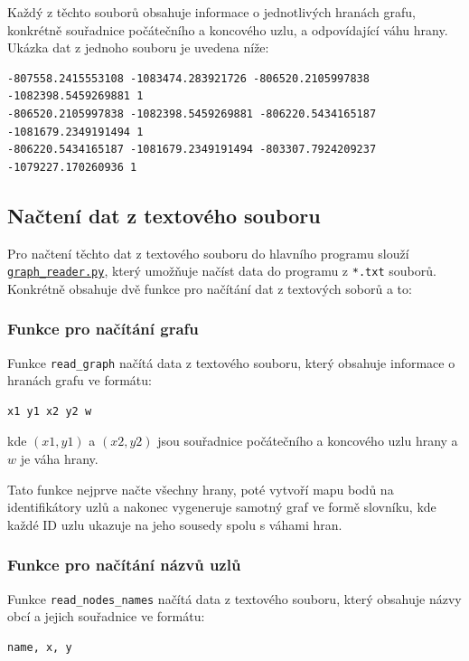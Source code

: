 Každý z těchto souborů obsahuje informace o jednotlivých hranách grafu, konkrétně souřadnice počátečního a koncového uzlu, a odpovídající váhu hrany. Ukázka dat z jednoho souboru je uvedena níže:
\begin{verbatim}
-807558.2415553108 -1083474.283921726 -806520.2105997838 -1082398.5459269881 1
-806520.2105997838 -1082398.5459269881 -806220.5434165187 -1081679.2349191494 1
-806220.5434165187 -1081679.2349191494 -803307.7924209237 -1079227.170260936 1
\end{verbatim}

\subsection{Načtení dat z textového souboru}

Pro načtení těchto dat z textového souboru do hlavního programu slouží \texttt{\href{https://github.com/kovarmi9/YGEI_sk3/blob/main/U3/graph\_reader.py}{graph\_reader.py}}, který umožňuje načíst data do programu z \texttt{*.txt} souborů. Konkrétně obsahuje dvě funkce pro načítání dat z textových soborů a to:

\subsubsection{Funkce pro načítání grafu}

Funkce \texttt{read\_graph} načítá data z textového souboru, který obsahuje informace o hranách grafu ve formátu:

\begin{verbatim}
x1 y1 x2 y2 w
\end{verbatim}

kde \((x1, y1)\) a \((x2, y2)\) jsou souřadnice počátečního a koncového uzlu hrany a \(w\) je váha hrany.

Tato funkce nejprve načte všechny hrany, poté vytvoří mapu bodů na identifikátory uzlů a nakonec vygeneruje samotný graf ve formě slovníku, kde každé ID uzlu ukazuje na jeho sousedy spolu s váhami hran.

\subsubsection{Funkce pro načítání názvů uzlů}

Funkce \texttt{read\_nodes\_names} načítá data z textového souboru, který obsahuje názvy obcí a jejich souřadnice ve formátu:

\begin{verbatim}
name, x, y
\end{verbatim}

